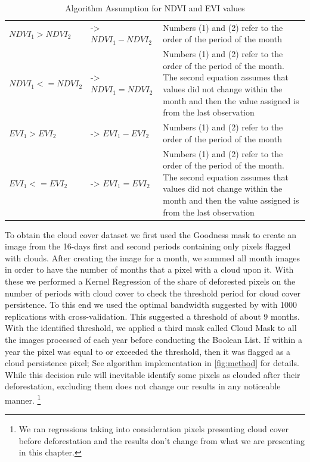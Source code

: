 \begin{table}[H]
\footnotesize
\caption{Algorithm Assumption for NDVI and EVI values}
\begin{tabularx}{\linewidth}{X X X}
\hline
\hline
$NDVI_{1} > NDVI_{2}$	& ->  $NDVI_{1} - NDVI_{2}$	 & Numbers (1) and (2) refer to the order of the period of the month \\
$NDVI_{1} <= NDVI_{2}$	& ->  $NDVI_{1} = NDVI_{2}$	 & Numbers (1) and (2) refer to the order of the period of the month. The second equation assumes that values did not change within the month and then the value assigned is from the last observation	\\
\hline
$EVI_{1} > EVI_{2}$	& ->  $EVI_{1} - EVI_{2}$	 & Numbers (1) and (2) refer to the order of the period of the month \\
$EVI_{1} <= EVI_{2}$	& ->  $EVI_{1} = EVI_{2}$	 & Numbers (1) and (2) refer to the order of the period of the month. The second equation assumes that values did not change within the month and then the value assigned is from the last observation 	\\
\hline
\hline
\end{tabularx}
\label{assumption}
\end{table}

To obtain the cloud cover dataset we first used the Goodness mask to create an image from the 16-days first and second periods containing only pixels flagged with clouds. After creating the image for a month, we summed all month images in order to have the number of months that a pixel with a cloud upon it. With these we performed a Kernel Regression of the share of deforested pixels on the number of periods with cloud cover to check the threshold period for cloud cover persistence. To this end we used the optimal bandwidth suggested by \citet{bowman_azzalini_1997} with 1000 replications with cross-validation. This suggested a threshold of about 9 months. With the identified threshold, we applied a third mask called Cloud Mask to all the images processed of each year before conducting the Boolean List. If within a year the pixel was equal to or exceeded the threshold, then it was flagged as a cloud persistence pixel; See algorithm implementation in \ref{fig:method} for details. While this decision rule will inevitable identify some pixels as clouded after their deforestation, excluding them does not change our results in any noticeable manner. \footnote{We ran regressions taking into consideration pixels presenting cloud cover before deforestation and the results don't change from what we are presenting in this chapter.}


